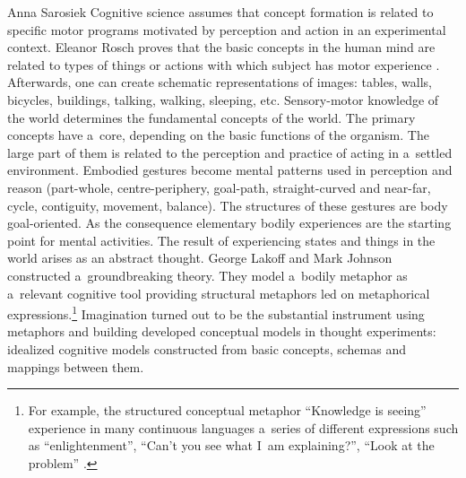 \begin{artengenv}{Anna Sarosiek}
Cognitive science assumes that concept formation is related to specific motor programs motivated by perception and action in an experimental context. Eleanor Rosch proves that the basic concepts in the human mind are related to types of things or actions with which subject has motor experience
\parencite[][]{rosch_principles_1999}. %
 Afterwards, one can create schematic representations of images: tables, walls, bicycles, buildings, talking, walking, sleeping, etc. Sensory-motor knowledge of the world determines the fundamental concepts of the world. The primary concepts have a~core, depending on the basic functions of the organism. The large part of them is related to the perception and practice of acting in a~settled environment. Embodied gestures become mental patterns used in perception and reason (part-whole, centre-periphery, goal-path, straight-curved and near-far, cycle, contiguity, movement, balance). The structures of these gestures are body goal-oriented. As the consequence elementary bodily experiences are the starting point for mental activities. The result of experiencing states and things in the world arises as an abstract thought. George Lakoff and Mark Johnson constructed a~groundbreaking theory. They model a~bodily metaphor as a~relevant cognitive tool providing structural metaphors led on metaphorical expressions.\footnote{For example, the structured conceptual metaphor ``Knowledge is seeing'' experience in many continuous languages a~series of different expressions such as ``enlightenment'', ``Can’t you see what I~am explaining?'', ``Look at the problem'' 
\parencite[][]{lakoff_metaphors_2008}.%
} Imagination turned out to be the substantial instrument using metaphors and building developed conceptual models in thought experiments: idealized cognitive models constructed from basic concepts, schemas and mappings between them.


\end{artengenv}
